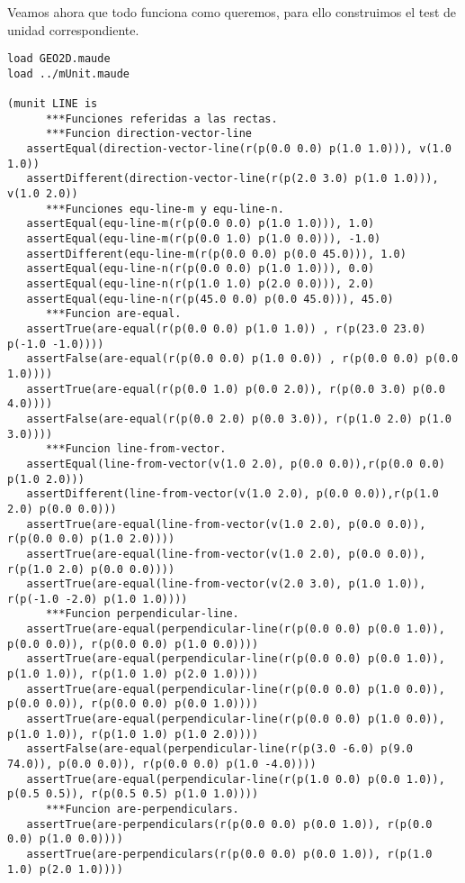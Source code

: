 Veamos ahora que todo funciona como queremos, para ello construimos el test de unidad correspondiente.


\begin{verbatim}
load GEO2D.maude
load ../mUnit.maude

(munit LINE is
      ***Funciones referidas a las rectas.
      ***Funcion direction-vector-line
   assertEqual(direction-vector-line(r(p(0.0 0.0) p(1.0 1.0))), v(1.0 1.0))	
   assertDifferent(direction-vector-line(r(p(2.0 3.0) p(1.0 1.0))), v(1.0 2.0))
      ***Funciones equ-line-m y equ-line-n.
   assertEqual(equ-line-m(r(p(0.0 0.0) p(1.0 1.0))), 1.0)
   assertEqual(equ-line-m(r(p(0.0 1.0) p(1.0 0.0))), -1.0)
   assertDifferent(equ-line-m(r(p(0.0 0.0) p(0.0 45.0))), 1.0)
   assertEqual(equ-line-n(r(p(0.0 0.0) p(1.0 1.0))), 0.0)
   assertEqual(equ-line-n(r(p(1.0 1.0) p(2.0 0.0))), 2.0)
   assertEqual(equ-line-n(r(p(45.0 0.0) p(0.0 45.0))), 45.0)
      ***Funcion are-equal.
   assertTrue(are-equal(r(p(0.0 0.0) p(1.0 1.0)) , r(p(23.0 23.0) p(-1.0 -1.0))))
   assertFalse(are-equal(r(p(0.0 0.0) p(1.0 0.0)) , r(p(0.0 0.0) p(0.0 1.0))))
   assertTrue(are-equal(r(p(0.0 1.0) p(0.0 2.0)), r(p(0.0 3.0) p(0.0 4.0))))
   assertFalse(are-equal(r(p(0.0 2.0) p(0.0 3.0)), r(p(1.0 2.0) p(1.0 3.0))))
      ***Funcion line-from-vector.
   assertEqual(line-from-vector(v(1.0 2.0), p(0.0 0.0)),r(p(0.0 0.0) p(1.0 2.0)))
   assertDifferent(line-from-vector(v(1.0 2.0), p(0.0 0.0)),r(p(1.0 2.0) p(0.0 0.0)))
   assertTrue(are-equal(line-from-vector(v(1.0 2.0), p(0.0 0.0)), r(p(0.0 0.0) p(1.0 2.0))))
   assertTrue(are-equal(line-from-vector(v(1.0 2.0), p(0.0 0.0)), r(p(1.0 2.0) p(0.0 0.0))))
   assertTrue(are-equal(line-from-vector(v(2.0 3.0), p(1.0 1.0)), r(p(-1.0 -2.0) p(1.0 1.0))))
      ***Funcion perpendicular-line.
   assertTrue(are-equal(perpendicular-line(r(p(0.0 0.0) p(0.0 1.0)), p(0.0 0.0)), r(p(0.0 0.0) p(1.0 0.0))))
   assertTrue(are-equal(perpendicular-line(r(p(0.0 0.0) p(0.0 1.0)), p(1.0 1.0)), r(p(1.0 1.0) p(2.0 1.0))))
   assertTrue(are-equal(perpendicular-line(r(p(0.0 0.0) p(1.0 0.0)), p(0.0 0.0)), r(p(0.0 0.0) p(0.0 1.0))))
   assertTrue(are-equal(perpendicular-line(r(p(0.0 0.0) p(1.0 0.0)), p(1.0 1.0)), r(p(1.0 1.0) p(1.0 2.0))))
   assertFalse(are-equal(perpendicular-line(r(p(3.0 -6.0) p(9.0 74.0)), p(0.0 0.0)), r(p(0.0 0.0) p(1.0 -4.0))))
   assertTrue(are-equal(perpendicular-line(r(p(1.0 0.0) p(0.0 1.0)), p(0.5 0.5)), r(p(0.5 0.5) p(1.0 1.0))))
      ***Funcion are-perpendiculars.
   assertTrue(are-perpendiculars(r(p(0.0 0.0) p(0.0 1.0)), r(p(0.0 0.0) p(1.0 0.0))))
   assertTrue(are-perpendiculars(r(p(0.0 0.0) p(0.0 1.0)), r(p(1.0 1.0) p(2.0 1.0))))

\end{verbatim}
